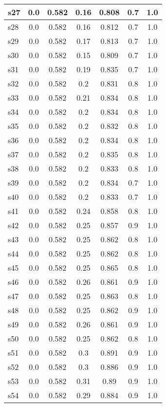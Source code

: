 \documentclass{article}
\begin{document}
\begin{tabular}{|l|c|c|c|c|c|c|}
\hline
s27 &0.0 & 0.582 & 0.16 & 0.808 & 0.7 & 1.0\\
\hline
s28 &0.0 & 0.582 & 0.16 & 0.812 & 0.7 & 1.0\\
\hline
s29 &0.0 & 0.582 & 0.17 & 0.813 & 0.7 & 1.0\\
\hline
s30 &0.0 & 0.582 & 0.15 & 0.809 & 0.7 & 1.0\\
\hline
s31 &0.0 & 0.582 & 0.19 & 0.835 & 0.7 & 1.0\\
\hline
s32 &0.0 & 0.582 & 0.2 & 0.831 & 0.8 & 1.0\\
\hline
s33 &0.0 & 0.582 & 0.21 & 0.834 & 0.8 & 1.0\\
\hline
s34 &0.0 & 0.582 & 0.2 & 0.834 & 0.8 & 1.0\\
\hline
s35 &0.0 & 0.582 & 0.2 & 0.832 & 0.8 & 1.0\\
\hline
s36 &0.0 & 0.582 & 0.2 & 0.834 & 0.8 & 1.0\\
\hline
s37 &0.0 & 0.582 & 0.2 & 0.835 & 0.8 & 1.0\\
\hline
s38 &0.0 & 0.582 & 0.2 & 0.833 & 0.8 & 1.0\\
\hline
s39 &0.0 & 0.582 & 0.2 & 0.834 & 0.7 & 1.0\\
\hline
s40 &0.0 & 0.582 & 0.2 & 0.833 & 0.7 & 1.0\\
\hline
s41 &0.0 & 0.582 & 0.24 & 0.858 & 0.8 & 1.0\\
\hline
s42 &0.0 & 0.582 & 0.25 & 0.857 & 0.9 & 1.0\\
\hline
s43 &0.0 & 0.582 & 0.25 & 0.862 & 0.8 & 1.0\\
\hline
s44 &0.0 & 0.582 & 0.25 & 0.862 & 0.8 & 1.0\\
\hline
s45 &0.0 & 0.582 & 0.25 & 0.865 & 0.8 & 1.0\\
\hline
s46 &0.0 & 0.582 & 0.26 & 0.861 & 0.9 & 1.0\\
\hline
s47 &0.0 & 0.582 & 0.25 & 0.863 & 0.8 & 1.0\\
\hline
s48 &0.0 & 0.582 & 0.25 & 0.862 & 0.9 & 1.0\\
\hline
s49 &0.0 & 0.582 & 0.26 & 0.861 & 0.9 & 1.0\\
\hline
s50 &0.0 & 0.582 & 0.25 & 0.862 & 0.8 & 1.0\\
\hline
s51 &0.0 & 0.582 & 0.3 & 0.891 & 0.9 & 1.0\\
\hline
s52 &0.0 & 0.582 & 0.3 & 0.886 & 0.9 & 1.0\\
\hline
s53 &0.0 & 0.582 & 0.31 & 0.89 & 0.9 & 1.0\\
\hline
s54 &0.0 & 0.582 & 0.29 & 0.884 & 0.9 & 1.0\\
\hline

\end{tabular}
\end{document}

